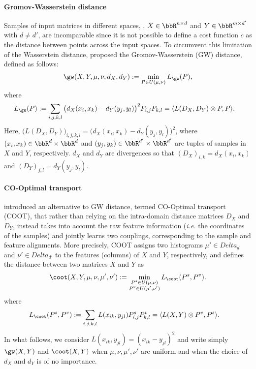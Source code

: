 \paragraph{Gromov-Wasserstein distance}
Samples of input matrices in different spaces, \ie, $X \in \bbR^{n\times d}$
and $Y \in \bbR^{m\times d'}$ with $d \neq d'$, are incomparable since
it is not possible to define a cost function $c$ as the distance between points across
the input spaces.
To circumvent this limitation of the Wasserstein distance, \citep{Memoli11}
proposed the Gromov-Wasserstein (GW) distance, defined as follows:
\begin{align}
    \gw(X, Y, \mu, \nu, d_X, d_Y) := \min_{P \in U(\mu, \nu)} L_{\gw} (P),
\end{align}
where
\begin{align*}
\label{eq:gw_func}
    L_{\gw} (P) &:=
    \sum_{i,j,k,l} \big( d_X(x_i,x_k) - d_Y(y_j,y_l) \big)^2 P_{i,j}P_{k,l}
    = \langle L(D_X, D_Y) \otimes P, P \rangle.
\end{align*}
Here, $\big( L(D_X, D_Y) \big)_{i,j,k,l} = \big( d_X(x_i,x_k) - d_Y(y_j,y_l) \big)^2$,
where $(x_i, x_k) \in \bbR^d \times \bbR^d$ and $(y_j, y_k) \in \bbR^{d'} \times \bbR^{d'}$
are tuples of samples in $X$ and $Y$, respectively.
$d_X$ and $d_Y$ are divergences so that $(D_X)_{i,k} = d_X(x_i,x_k)$ and
$(D_Y)_{j,l} = d_Y(y_j,y_l)$.

\paragraph{CO-Optimal transport}
\citep{Redko20} introduced an alternative to GW distance, termed CO-Optimal transport (COOT),
that rather than relying on the intra-domain distance matrices $D_X$ and $D_Y$,
instead takes into account the raw feature information
(\textit{i.e.} the coordinates of the samples) and jointly learns two couplings,
corresponding to the sample and feature alignments. More precisely,
COOT assigns two histograms $\mu' \in Delta_d$ and $\nu' \in Delta_{d'}$ to the
features (columns) of $X$ and $Y$, respectively, and defines the distance between two matrices
$X$ and $Y$ as
\begin{equation*}
  \label{eq:co-optimal-transport}
 \begin{split}
     \coot(X, Y, \mu, \nu, \mu', \nu') :=
     \min_{\substack{P^s \in U(\mu,\nu) \\ P^v \in U(\mu',\nu')}} L_{\coot} (P^s, P^v).
    \end{split}
 \end{equation*}
where
\begin{align*}
    L_\coot (P^s, P^v) &:=  \sum_{i,j,k,l} L(x_{ik},y_{jl})P^s_{i,j} P^v_{k,l}
    =\langle L(X,Y) \otimes P^v,  P^s \rangle.
\end{align*}
In what follows, we consider $L(x_{ik}, y_{jl}) = (x_{ik} - y_{jl})^2$ and write simply
$\gw(X, Y)$ and $\coot(X, Y)$ when $\mu, \nu, \mu', \nu'$
are uniform and when the choice of $d_X$ and $d_Y$ is of no importance.

